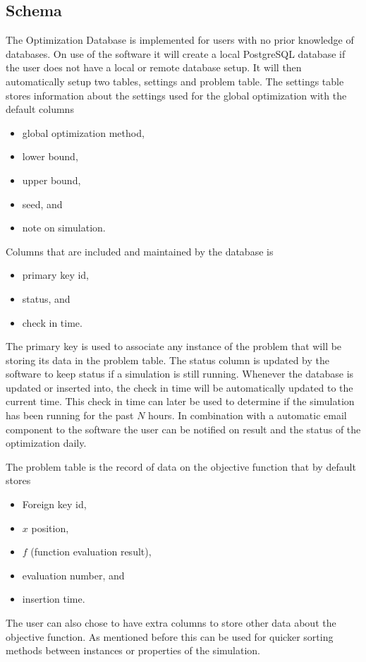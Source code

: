 \subsection{Schema}

The Optimization Database is implemented for users with no prior knowledge of databases. On use of the software it will create a local PostgreSQL database if the user does not have a local or remote database setup. It will then automatically setup two tables, settings and problem table. The settings table stores information about the settings used for the global optimization with the default columns
\begin{itemize}
    \item global optimization method,
    \item lower bound,
    \item upper bound,
    \item seed, and
    \item note on simulation. 
\end{itemize}
Columns that are included and maintained by the database is
\begin{itemize}
    \item primary key id,
    \item status, and 
    \item check in time. 
\end{itemize}
The primary key is used to associate any instance of the problem that will be storing its data in the problem table. The status column is updated by the software to keep status if a simulation is still running. Whenever the database is updated or inserted into, the check in time will be automatically updated to the current time. This check in time can later be used to determine if the simulation has been running for the past $N$ hours. In combination with a automatic email component to the
software the user can be notified on result and the status of the optimization daily. 

The problem table is the record of data on the objective function that by default stores
\begin{itemize}
    \item Foreign key id,
    \item $x$ position,
    \item $f$ (function evaluation result),
    \item evaluation number, and
    \item insertion time.
\end{itemize}
The user can also chose to have extra columns to store other data about the objective function. As mentioned before this can be used for quicker sorting methods between instances or properties of the simulation. 

